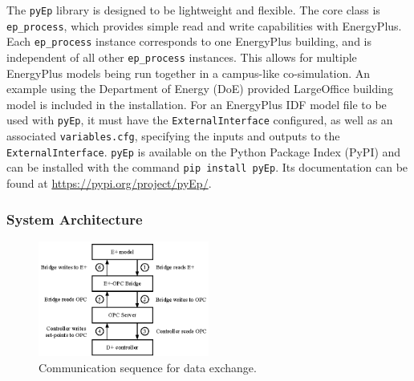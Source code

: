 The \texttt{pyEp} library is designed to be lightweight and flexible. 
The core class is \texttt{ep\_process}, which provides simple read and write capabilities with EnergyPlus. 
Each \texttt{ep\_process} instance corresponds to one EnergyPlus building, and is independent of all other \texttt{ep\_process} instances. 
This allows for multiple EnergyPlus models being run together in a campus-like co-simulation. 
An example using the Department of Energy (DoE) provided LargeOffice building model is included in the installation. 
For an EnergyPlus IDF model file to be used with \texttt{pyEp}, it must have the \texttt{ExternalInterface} configured, as well as an associated \texttt{variables.cfg}, specifying the inputs and outputs to the \texttt{ExternalInterface}.
\texttt{pyEp} is available on the Python Package Index (PyPI) and can be installed with the command \verb|pip install pyEp|.
Its documentation can be found at \url{https://pypi.org/project/pyEp/}.

\subsubsection{System Architecture}

\begin{figure}[t]
	\centering
	\includegraphics[width=0.5\textwidth]{images/architecture.eps}
	\caption{Communication sequence for data exchange.}
	\label{F:architecture}
\end{figure}


